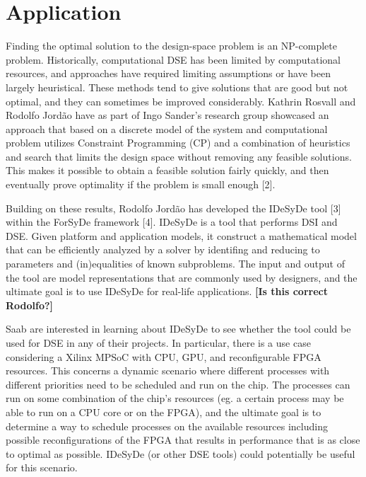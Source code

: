 \documentclass[12pt,notitlepage]{article}
\begin{document}
\section{Application}
Finding the optimal solution to the design-space problem is an NP-complete problem. Historically, computational DSE has been limited by computational resources, and approaches have required limiting assumptions or have been largely heuristical. These methods tend to give solutions that are good but not optimal, and they can sometimes be improved considerably. Kathrin Rosvall and Rodolfo Jordão have as part of Ingo Sander's research group showcased an approach that based on a discrete model of the system and computational problem utilizes Constraint Programming (CP) and a combination of heuristics and search that limits the design space without removing any feasible solutions. This makes it possible to obtain a feasible solution fairly quickly, and then eventually prove optimality if the problem is small enough [2].

Building on these results, Rodolfo Jordão has developed the IDeSyDe tool [3] within the ForSyDe framework [4]. IDeSyDe is a tool that performs DSI and DSE. Given platform and application models, it construct a mathematical model that can be efficiently analyzed by a solver by identifing and reducing to parameters and (in)equalities of known subproblems. The input and output of the tool are model representations that are commonly used by designers, and the ultimate goal is to use IDeSyDe for real-life applications. \textbf{[Is this correct Rodolfo?]}

Saab are interested in learning about IDeSyDe to see whether the tool could be used for DSE in any of their projects. In particular, there is a use case considering a Xilinx MPSoC with CPU, GPU, and reconfigurable FPGA resources. This concerns a dynamic scenario where different processes with different priorities need to be scheduled and run on the chip. The processes can run on some combination of the chip's resources (eg. a certain process may be able to run on a CPU core or on the FPGA), and the ultimate goal is to determine a way to schedule processes on the available resources including possible reconfigurations of the FPGA that results in performance that is as close to optimal as possible. IDeSyDe (or other DSE tools) could potentially be useful for this scenario.
\end{document}
